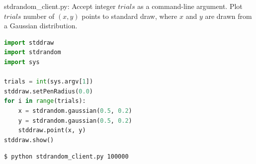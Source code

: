 \documentclass[8pt,a4paper,compress]{beamer}
\begin{document}
\begin{frame}[fragile]
\pause

\begin{framed}
\tiny stdrandom\_client.py: Accept integer $trials$ as a command-line argument. Plot $trials$ number of $(x, y)$ points to standard draw, where $x$ and $y$ are drawn from a Gaussian distribution.
\end{framed}

\begin{lstlisting}[language=Python]
import stddraw
import stdrandom
import sys

trials = int(sys.argv[1])
stddraw.setPenRadius(0.0)
for i in range(trials):
    x = stdrandom.gaussian(0.5, 0.2)
    y = stdrandom.gaussian(0.5, 0.2)
    stddraw.point(x, y)
stddraw.show()
\end{lstlisting}

\pause

\begin{minipage}{160pt}
\begin{lstlisting}[language={}]
$ python stdrandom_client.py 100000
\end{lstlisting}
\end{minipage}%
\begin{minipage}{140pt}
\hfill {}
\end{minipage}
\end{frame}
\end{document}
